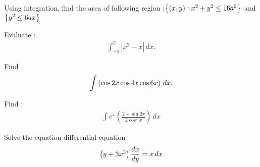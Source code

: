 \item Using  integration, find the area of following region :$\left\{\left(x,y\right):x^2+y^2\leq16a^2\right\}$ and $\left\{y^2\leq6ax\right\}$
\item Evaluate :
\begin{align*}
\int_{-1}^{2}|x^2-x|\, dx.
\end{align*}  
                                             
\item Find
\begin{align*}
\int\left(\cos2x\cos4x\cos6x\right) \, dx. 
\end{align*}         
\item Find :
\begin{align*}
\int{e^x\left(\frac{2+\sin 2x}{2\cos^2 x}\right) \, dx}
\end{align*}
\item Solve the equation differential equation 
\begin{align*}
\left(y+3x^2\right)\frac{dx}{dy}=x\, dx
\end{align*}

